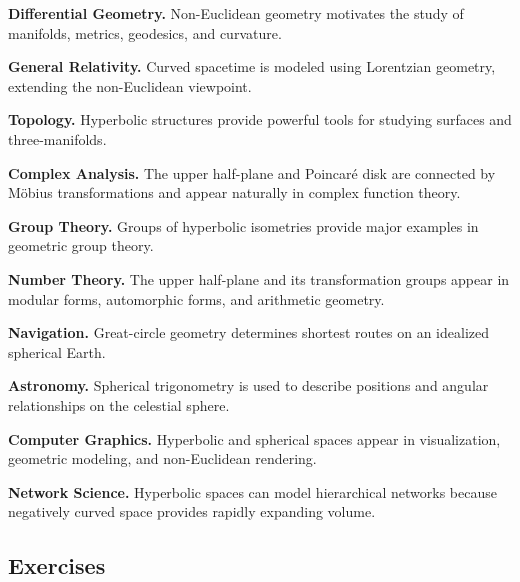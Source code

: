 \begin{applicationbox}
\textbf{Differential Geometry.}
Non-Euclidean geometry motivates the study of manifolds, metrics, geodesics,
and curvature.

\medskip

\textbf{General Relativity.}
Curved spacetime is modeled using Lorentzian geometry, extending the
non-Euclidean viewpoint.

\medskip

\textbf{Topology.}
Hyperbolic structures provide powerful tools for studying surfaces and
three-manifolds.

\medskip

\textbf{Complex Analysis.}
The upper half-plane and Poincar\'e disk are connected by M\"obius
transformations and appear naturally in complex function theory.

\medskip

\textbf{Group Theory.}
Groups of hyperbolic isometries provide major examples in geometric group
theory.

\medskip

\textbf{Number Theory.}
The upper half-plane and its transformation groups appear in modular forms,
automorphic forms, and arithmetic geometry.

\medskip

\textbf{Navigation.}
Great-circle geometry determines shortest routes on an idealized spherical
Earth.

\medskip

\textbf{Astronomy.}
Spherical trigonometry is used to describe positions and angular
relationships on the celestial sphere.

\medskip

\textbf{Computer Graphics.}
Hyperbolic and spherical spaces appear in visualization, geometric modeling,
and non-Euclidean rendering.

\medskip

\textbf{Network Science.}
Hyperbolic spaces can model hierarchical networks because negatively curved
space provides rapidly expanding volume.
\end{applicationbox}

\subsection{Exercises}
\label{subsec:non-euclidean-exercises}

